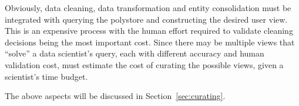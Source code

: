 Obviously, data cleaning, data transformation and entity consolidation must be integrated with querying the polystore and constructing the desired user view.  
This is an expensive process with the human effort required to validate cleaning decisions being the most important cost. 
Since there may be multiple views that ``solve'' a data scientist's query, each with different accuracy and human validation cost, \dcv must estimate the cost of curating the possible views,
given a scientist's time budget. 





The above aspects will be discussed in Section~\ref{sec:curating}.



